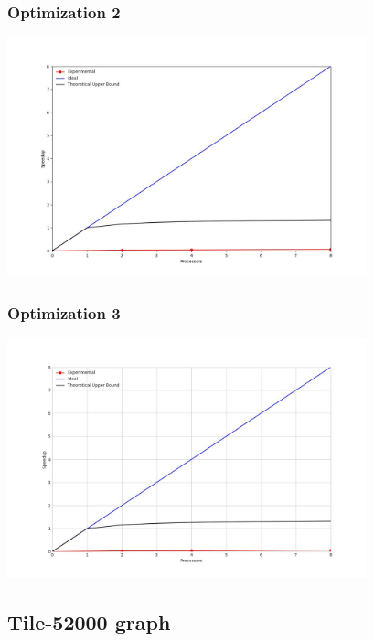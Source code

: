 \subsubsection{Optimization 2}
\begin{center}
    \resizebox{0.8\textwidth}{!}{}
    \includegraphics[width=0.78\textwidth]{../img/speedup-graph_type-random-500000-O2}
\end{center}

\subsubsection{Optimization 3}
\begin{center}
    \resizebox{0.8\textwidth}{!}{}
    \includegraphics[width=0.78\textwidth]{../img/speedup-graph_type-random-500000-O3}
\end{center}

\clearpage
\subsection{Tile-52000 graph}
